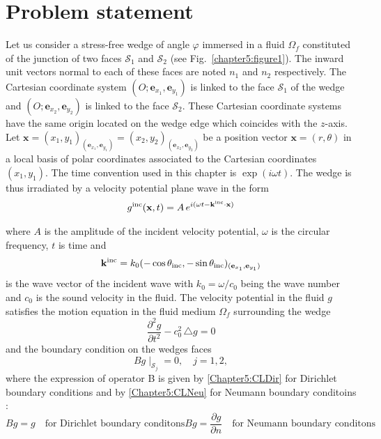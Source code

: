 \section{Problem statement}
\label{Chapter5:problem}

Let us consider a stress-free wedge of angle $\varphi$ immersed in a fluid $\Omega_f$ constituted of the junction of two faces $\mathcal{S}_1$ and $\mathcal{S}_2$ (see Fig.~\ref{chapter5:figure1}). The inward unit vectors normal to each of these faces are noted $n_1$ and $n_2$ respectively. The Cartesian coordinate system $(O; \mathbf{e}_{x_1}, \mathbf{e}_{y_1} )$ is linked to the face $\mathcal{S}_1$ of the wedge and $(O;  \mathbf{e}_{x_2}, \mathbf{e}_{y_2} )$ is linked to the face $\mathcal{S}_2$. These Cartesian coordinate systems  have the same origin located on the wedge edge which coincides with the $z$-axis. Let $\mathbf{x} = (x_1,y_1)_{ (\mathbf{e}_{x_1}, \mathbf{e}_{y_1}) } = (x_2,y_2)_{ (\mathbf{e}_{x_2}, \mathbf{e}_{y_2})}$ be a position vector $\mathbf{x} = (r,\theta)$ in a local basis of polar coordinates associated to the Cartesian coordinates $(x_1,y_1)$. The time convention used in this chapter is $\exp(i\omega t)$. The wedge is thus irradiated by a velocity potential plane wave in the form
\begin{align}
\label{Chapter5:incidence_wave}
g^{\rm inc}(\mathbf{x},t) = A \, e^{i(\omega t - \mathbf{k}^{\rm inc} \cdot \mathbf{x})}
\end{align}

where $A$ is the amplitude of the incident velocity potential, $\omega$ is the circular frequency, $t$ is time and 
\begin{align}
\mathbf{k}^{\rm inc} = k_0 (-\cos \theta_{\rm inc},-\sin \theta_{\rm inc})_{(\mathbf{e}_{x_1}, \mathbf{e}_{y_1})}
\end{align}
is the wave vector of the incident wave with $k_0 = \omega/c_0$ being the wave number and $c_0$ is the sound velocity in the fluid.  The velocity potential in the fluid $g$ satisfies the motion equation in the fluid medium $\Omega_f$ surrounding the wedge 
\begin{equation}
\label{Chapter5:WaveMotion}
\frac{\partial^2 g}{\partial t^2} - c_0^2 \, \triangle g = 0
\end{equation}
and the boundary condition on the wedges faces
\begin{equation}
\label{Chapter5:CL}
Bg\mid_{\mathcal{S}_j} = 0, \quad j=1,2,
\end{equation}
where the expression of operator B is given by \eqref{Chapter5:CLDir} for Dirichlet boundary conditions and by \eqref{Chapter5:CLNeu} for Neumann boundary conditoins :
\begin{subequations}
\begin{equation}
\label{Chapter5:CLDir}
Bg = g \quad \mbox{for Dirichlet boundary conditons}
\end{equation}
\begin{equation}
\label{Chapter5:CLNeu}
Bg = \frac{\partial g}{\partial n} \quad \mbox{for Neumann boundary conditons}
\end{equation}
\end{subequations}

